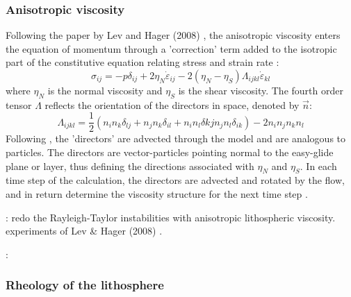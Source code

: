 \subsubsection{Anisotropic viscosity}

Following the paper by Lev and Hager (2008) \cite{leha08}, 
the anisotropic viscosity enters the equation of momentum through a 'correction'
term added to the isotropic part of the constitutive equation relating
stress and strain rate \cite{mumh02}:
\[
\sigma_{ij} = -p \delta_{ij} + 2 \eta_N \dot{\varepsilon}_{ij}  - 2(\eta_N-\eta_S)\Lambda_{ijkl}\dot{\varepsilon}_{kl} 
\]
where $\eta_N$ is the normal viscosity and $\eta_S$ is the shear viscosity. 
The fourth order tensor $\Lambda$ reflects the orientation of the directors in space, 
denoted by $\vec{n}$:
\[
\Lambda_{ijkl}=\frac{1}{2} (n_i n_k \delta_{lj} + n_j n_k \delta_{il} + n_i n_l \delta{kj} n_j n_l \delta_{ik} )
- 2 n_i n_j n_k n_l 
\]
Following \cite{modm03,mumh02}, the 'directors' are advected through the model and are 
analogous to particles. The directors are
vector-particles pointing normal to the easy-glide plane or layer,
thus defining the directions associated with $\eta_N$ and $\eta_S$. 
In each time
step of the calculation, the directors are advected and rotated by the
flow, and in return determine the viscosity structure for the next time
step \cite{mumc04}.

\mscthesis{}: redo the Rayleigh-Taylor instabilities with anisotropic lithospheric viscosity.
experiments of Lev \& Hager (2008) \cite{leha08}. 

\Literature: \cite{mumh02,vatb98,mumc04,mumh02,mima04,rida78,saab84}

\subsubsection{Rheology of the lithosphere}


